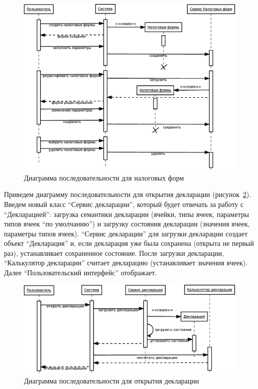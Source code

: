 \documentclass[14pt,a4paper]{reportmod}
\begin{document}
\begin{figure}
  \centering
  \includegraphics[scale=0.4]{uml/_sequence_6}
  \caption{Диаграмма последовательности для налоговых форм}
  \label{pic:sequence_3}
\end{figure}

Приведем диаграмму последовательности для открытия декларации (рисунок~\ref{pic:sequence_4}). Введем новый класс ``Сервис декларации'', который будет отвечать за работу с ``Декларацией'': загрузка семантики декларации (ячейки, типы ячеек, параметры типов ячеек ``по умолчанию'') и загрузку состояния декларации (значения ячеек, параметры типов ячеек). ``Сервис декларации'' для загрузки декларации создает объект ``Декларация'' и, если декларация уже была сохранена (открыта не первый раз), устанавливает сохраненное состояние. После загрузки декларации, ``Калькулятор декларации'' считает декларацию (устанавливает значения ячеек). Далее ``Пользовательский интерфейс'' отображает.

\begin{figure}
  \centering
  \includegraphics[scale=0.4]{uml/_sequence_1}
  \caption{Диаграмма последовательности для открытия декларации}
  \label{pic:sequence_4}
\end{figure}
\end{document}
